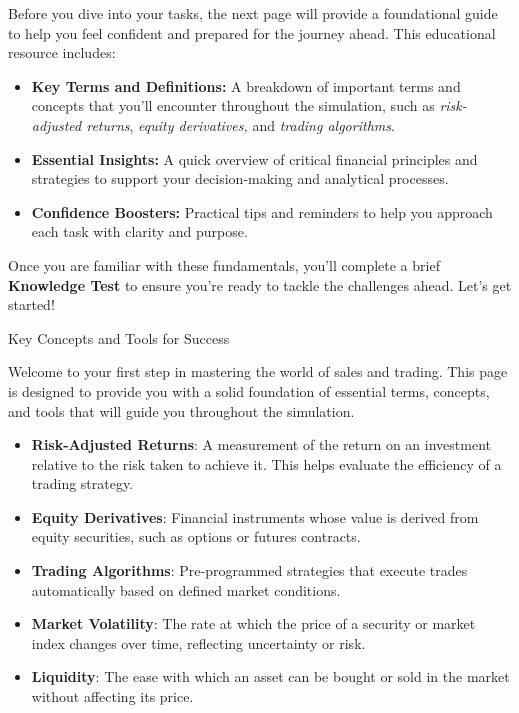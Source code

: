\documentclass[11pt]{article}
\begin{document}
Before you dive into your tasks, the next page will provide a foundational
guide to help you feel confident and prepared for the journey ahead. This
educational resource includes:
\begin{itemize}[leftmargin=1.5em, itemsep=2pt]
  \item \textbf{Key Terms and Definitions:} A breakdown of important terms and
  concepts that you'll encounter throughout the simulation, such as
  \textit{risk-adjusted returns}, \textit{equity derivatives,} and
  \textit{trading algorithms}.
  \item \textbf{Essential Insights:} A quick overview of critical financial
  principles and strategies to support your decision-making and analytical
  processes.
  \item \textbf{Confidence Boosters:} Practical tips and reminders to help you
  approach each task with clarity and purpose.
\end{itemize}

Once you are familiar with these fundamentals, you'll complete a brief
\textbf{Knowledge Test} to ensure you're ready to tackle the challenges ahead.
Let's get started!

\newpage
{\fontsize{26}{30}\selectfont Key Concepts and Tools for Success}\par\bigskip

Welcome to your first step in mastering the world of sales and trading. This
page is designed to provide you with a solid foundation of essential terms,
concepts, and tools that will guide you throughout the simulation.

\begin{itemize}[leftmargin=1.5em, itemsep=2pt]
  \item \textbf{Risk-Adjusted Returns}: A measurement of the return on an
  investment relative to the risk taken to achieve it. This helps evaluate the
  efficiency of a trading strategy.
  \item \textbf{Equity Derivatives}: Financial instruments whose value is
  derived from equity securities, such as options or futures contracts.
  \item \textbf{Trading Algorithms}: Pre-programmed strategies that execute
  trades automatically based on defined market conditions.
  \item \textbf{Market Volatility}: The rate at which the price of a security
  or market index changes over time, reflecting uncertainty or risk.
  \item \textbf{Liquidity}: The ease with which an asset can be bought or sold
  in the market without affecting its price.
\end{itemize}
\end{document}
